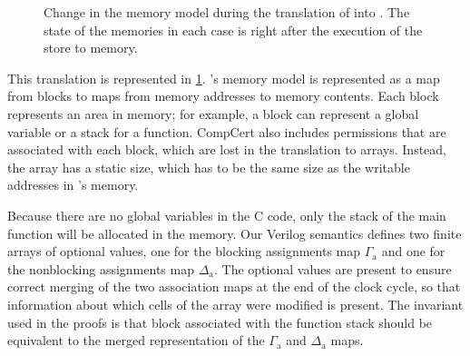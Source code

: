 \begin{figure}
  \caption{Change in the memory model during the translation of \rtl{} into
    \htl{}.  The state of the memories in each case is right after the execution
    of the store to memory.}\label{fig:memory_model_transl}
\end{figure}

This translation is represented in \cref{fig:memory_model_transl}.
\compcert{}'s memory model is represented as a map from blocks to maps from
memory addresses to memory contents.  Each block represents an area in memory;
for example, a block can represent a global variable or a stack for a function.
CompCert also includes permissions that are associated with each block, which
are lost in the translation to arrays.  Instead, the array has a static size,
which has to be the same size as the writable addresses in \compcert{}'s memory.

Because there are no global variables in the C code, only the stack of the main
function will be allocated in the memory.  Our Verilog semantics defines two
finite arrays of optional values, one for the blocking assignments map
$\Gamma_{\mathrm{a}}$ and one for the nonblocking assignments map
$\Delta_{\mathrm{a}}$.  The optional values are present to ensure correct
merging of the two association maps at the end of the clock cycle, so that
information about which cells of the array were modified is present.  The
invariant used in the proofs is that block associated with the function stack
should be equivalent to the merged representation of the $\Gamma_{\mathrm{a}}$
and $\Delta_{\mathrm{a}}$ maps.

